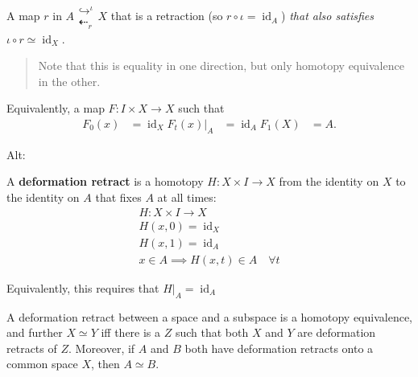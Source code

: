 \begin{definition}[Deformation]

\end{definition}


\begin{definition}

A map \(r\) in
\(A\mathrel{\textstyle\substack{\hookrightarrow^{\iota}\\\textstyle\dashleftarrow_{r}}} X\)
that is a retraction (so \(r\circ \iota = \operatorname{id}_{A}\))
\emph{that also satisfies}
\(\iota \circ r \simeq\operatorname{id}_{X}\).

\begin{quote}
Note that this is equality in one direction, but only homotopy
equivalence in the other.
\end{quote}

Equivalently, a map \(F:I\times X\to X\) such that
\begin{align*}
F_{0}(x) &= \operatorname{id}_{X}
F_{t}(x)\mathrel{\Big|}_{A} &= \operatorname{id}_{A}
F_{1}(X) &= A
.\end{align*}

Alt:

A \textbf{deformation retract} is a homotopy \(H:X\times I \to X\) from
the identity on \(X\) to the identity on \(A\) that fixes \(A\) at all
times:
\begin{align*}
H: X\times I \to X \\
H(x, 0) = \operatorname{id}_X \\
H(x, 1) = \operatorname{id}_A \\
x\in A \implies H(x, t) \in A \quad \forall t
\end{align*}

Equivalently, this requires that
\({\left.{{H}} \right|_{{A}} } = \operatorname{id}_A\)

\end{definition}

\begin{remark}

A deformation retract between a space and a subspace is a homotopy
equivalence, and further \(X\simeq Y\) iff there is a \(Z\) such that
both \(X\) and \(Y\) are deformation retracts of \(Z\). Moreover, if
\(A\) and \(B\) both have deformation retracts onto a common space
\(X\), then \(A \simeq B\).

\end{remark}


